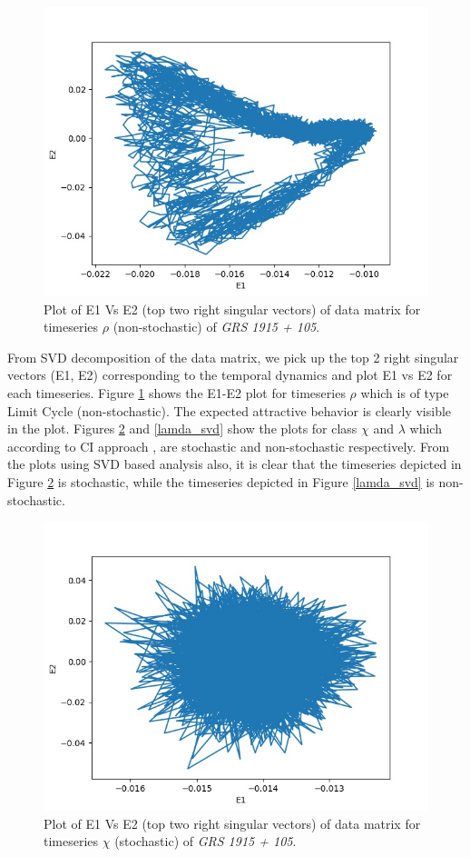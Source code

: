 \documentclass[10pt,conference]{IEEEtran}
\begin{document}
\begin{figure}[ht]
  \centering
  \includegraphics[width=\linewidth]{rho_svd.jpg}
  \caption{Plot of E1 Vs E2 (top two right singular vectors) of data matrix for  timeseries $\rho$ (non-stochastic) of \textit{GRS 1915 + 105}.}
  \label{svd_rho}
\end{figure}

From SVD decomposition of the data matrix, we pick up the top 2 right singular vectors (E1, E2) corresponding to the temporal dynamics and plot E1 vs E2 for each timeseries. Figure \ref{svd_rho} shows the E1-E2 plot for timeseries $\rho$ which is of type Limit Cycle \cite{misra2006} (non-stochastic). The expected attractive behavior is clearly visible in the plot. Figures \ref{chi_svd} and \ref{lamda_svd} show the plots for class $\chi$ and $\lambda$  which  according to CI approach , are stochastic and non-stochastic respectively. From the plots  using SVD based analysis also, it is clear  that the timeseries depicted in Figure \ref{chi_svd} is stochastic, while the timeseries depicted in Figure \ref{lamda_svd} is non-stochastic.

\begin{figure}[ht]
  \centering
  \includegraphics[width=\linewidth]{chi_svd.jpg}
  \caption{Plot of E1 Vs E2 (top two right singular vectors) of data matrix for  timeseries $\chi$ (stochastic) of \textit{GRS 1915 + 105}.}
  \label{chi_svd}
\end{figure}
\end{document}
